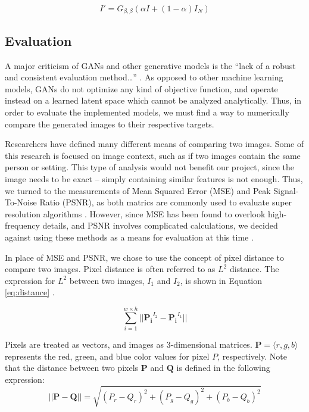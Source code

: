 \documentclass[letterpaper]{article} %
\begin{document}
\begin{equation}
\label{eq:alter}
I' = G_{\beta,\beta}(\alpha I + (1 - \alpha)I_{N})
\end{equation}

\subsection{Evaluation}
A major criticism of GANs and other generative models is the
``lack of a robust and consistent evaluation method\dots''
\cite{gmm}.
As opposed to other machine learning models, GANs do not optimize any kind of objective function,
and operate instead on a learned latent space
which cannot be analyzed analytically.
Thus, in order to evaluate the implemented models,
we must find a way to numerically compare the generated images to their respective targets.

Researchers have defined many different means of comparing two images.
Some of this research is focused on image context, such as if two images contain the same
person or setting.
This type of analysis would not benefit our project,
since the image needs to be exact --
simply containing similar features is not enough.
Thus, we turned to the measurements of
Mean Squared Error (MSE) and Peak Signal-To-Noise Ratio (PSNR),
as both matrics are commonly used to evaluate super resolution algorithms
\cite{super_resolution}.
However, since MSE has been found to overlook high-frequency details,
and PSNR involves complicated calculations,
we decided against using these methods as a means for evaluation
at this time
\cite{srgan}.

In place of MSE and PSNR, we chose to use the concept of pixel distance
to compare two images.
Pixel distance is often referred to as $L^2$ distance.
The expression for $L^2$ between two images, $I_1$ and $I_2$, is
shown in Equation \ref{eq:distance} \cite{graphics}.

\begin{equation}
\label{eq:distance}
\sum_{i=1}^{w \times h}||\mathbf{P_i}^{I_2} - \mathbf{P_i}^{I_1}||
\end{equation}

Pixels are treated as vectors, and images as
3-dimensional matrices.
$\mathbf{P} = \langle r,g,b \rangle$ represents
the red, green, and blue color values for pixel $P$,
respectively.
Note that the distance between
two pixels $\mathbf{P}$ and $\mathbf{Q}$ is defined in the following expression:
$$||\mathbf{P} - \mathbf{Q}|| =
\sqrt{(P_r - Q_r)^2 + (P_g - Q_g)^2 + (P_b - Q_b)^2}$$
\end{document}
